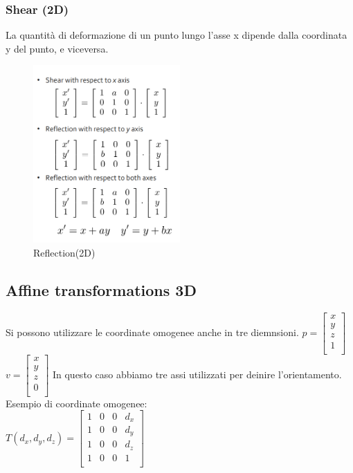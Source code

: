 \subsubsection{Shear (2D)}
La quantità di deformazione di un punto lungo l'asse x dipende dalla coordinata y del punto, e viceversa.
\begin{figure}[H]
    \centering
    \includegraphics[width=0.5\textwidth]{images/Shear.png} 
    \caption{Reflection(2D)}
    \label{fig:immagine}
\end{figure}
\subsection{Affine transformations 3D}
Si possono utilizzare le coordinate omogenee anche in tre diemnsioni.
$p=\begin{bmatrix}
    x \\
    y \\
    z \\
    1 \\
\end{bmatrix}
$ \\
$v=\begin{bmatrix}
    x \\
    y \\
    z \\
    0 \\
\end{bmatrix}
$
In questo caso abbiamo tre assi utilizzati per deinire l'orientamento.
Esempio di coordinate omogenee:
\\
$T(d_x,d_y,d_z)=
\begin{bmatrix}
    1 & 0 & 0 & d_x \\
    1 & 0 & 0 & d_y \\
    1 & 0 & 0 & d_z \\
    1 & 0 & 0 & 1 \\
\end{bmatrix}$
